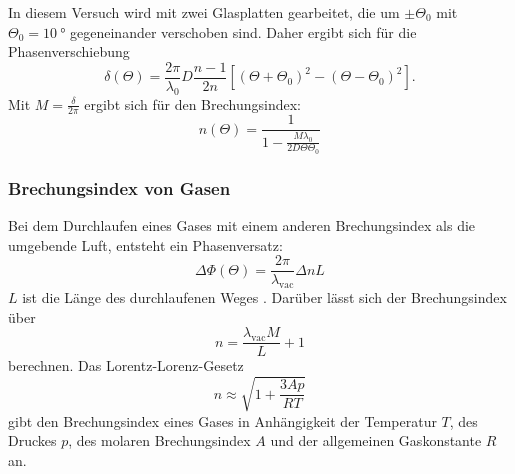 In diesem Versuch wird mit zwei Glasplatten gearbeitet, die um $ \pm \Theta_0$ mit $\Theta_0 = \SI{10}{\degree}$ gegeneinander verschoben sind. Daher ergibt 
sich für die Phasenverschiebung 
\begin{equation*}
    \delta(\Theta) = \frac{2 \pi}{\lambda_0} D \frac{n-1}{2n} \left[ (\Theta + \Theta_0)^2 - (\Theta - \Theta_0)^2 \right]. 
\end{equation*}
Mit $ M = \frac{\delta}{2 \pi} $ ergibt sich für den Brechungsindex:
\begin{equation}
    n(\Theta) = \frac{1}{1 - \frac{M \lambda_0}{2 D \Theta \Theta_0}}
    \label{eqn:n_Glas}
\end{equation}

\subsubsection{Brechungsindex von Gasen}
Bei dem Durchlaufen eines Gases mit einem anderen Brechungsindex als die umgebende Luft,
entsteht ein Phasenversatz:
\begin{equation}
\Delta \Phi(\Theta)=\frac{2\pi}{\lambda_{\text{vac}}} \Delta n L
\label{eq:pM2}
\end{equation}
$L$ ist die Länge des durchlaufenen Weges \cite{V64}.
Darüber lässt sich der Brechungsindex über
\begin{equation}
  \label{eqn:n_luft}
  n = \frac{\lambda_{\text{vac}} M }{L} + 1
\end{equation}
\noindent berechnen.
\newline \newline
\noindent Das Lorentz-Lorenz-Gesetz
\begin{equation}
  n \approx \sqrt{1+ \frac{3Ap}{RT}}
  \label{eqn:lorentz}
\end{equation}
gibt den Brechungsindex eines Gases in Anhängigkeit der Temperatur $T$,
des Druckes $p$, des molaren Brechungsindex $A$ 
und der allgemeinen Gaskonstante $R$ an.
